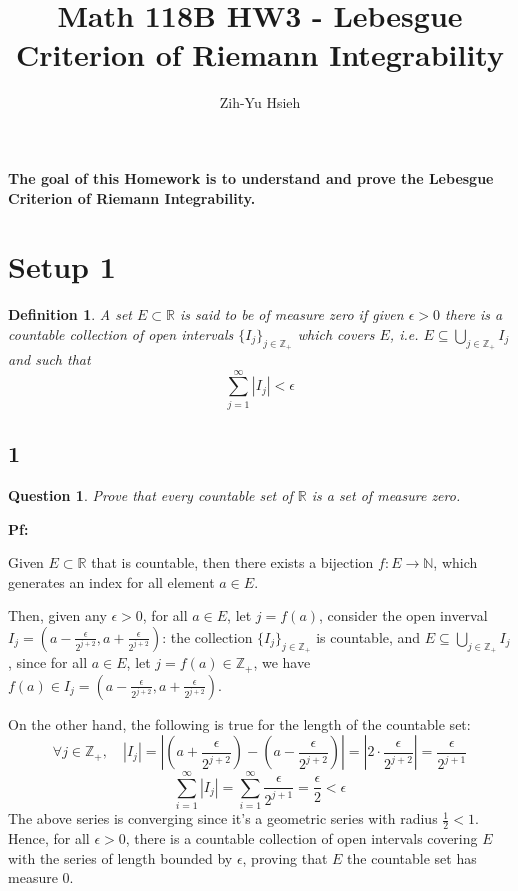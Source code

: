 \documentclass{article}
\title{Math 118B HW3 - Lebesgue Criterion of Riemann Integrability}
\author{Zih-Yu Hsieh}
\newtheorem{definition}{Definition}
\newtheorem{question}{Question}
\begin{document}
\maketitle

\textbf{The goal of this Homework is to understand and prove the Lebesgue Criterion of Riemann Integrability.}

\section*{Setup 1}
\begin{myBox}[]{}
    \begin{definition}
        A set $E\subset \mathbb{R}$ is said to be of measure zero if given $\epsilon>0$ there is a
        countable collection of open intervals $\{I_j\}_{j\in\mathbb{Z}_+}$ which covers $E$, i.e. 
        $E\subseteq \bigcup_{j\in\mathbb{Z}_+}I_j$ and such that
        $$\sum_{j=1}^{\infty}|I_j|<\epsilon$$
    \end{definition}
\end{myBox}

\subsection*{1}
\begin{myBox2}[]{}
    \begin{question}
        Prove that every countable set of $\mathbb{R}$ is a set of measure zero.
    \end{question}
\end{myBox2}

\textbf{Pf:}

Given $E\subset \mathbb{R}$ that is countable, then there exists a bijection $f:E\rightarrow \mathbb{N}$,
which generates an index for all element $a\in E$. 

Then, given any $\epsilon>0$, for all $a\in E$, let $j=f(a)$, consider the open inverval $I_j=(a-\frac{\epsilon}{2^{j+2}},a+\frac{\epsilon}{2^{j+2}})$: 
the collection $\{I_j\}_{j\in\mathbb{Z}_+}$ is countable, and $E\subseteq \bigcup_{j\in\mathbb{Z}_+}I_j$,
since for all $a\in E$, let $j=f(a)\in\mathbb{Z}_+$, we have $f(a)\in I_j=(a-\frac{\epsilon}{2^{j+2}},a+\frac{\epsilon}{2^{j+2}})$.

On the other hand, the following is true for the length of the countable set:
$$\forall j\in\mathbb{Z}_+,\quad |I_j| = \left|(a+\frac{\epsilon}{2^{j+2}})-(a-\frac{\epsilon}{2^{j+2}})\right|=\left|2\cdot \frac{\epsilon}{2^{j+2}}\right|=\frac{\epsilon}{2^{j+1}}$$
$$\sum_{i=1}^{\infty}|I_j|=\sum_{i=1}^{\infty}\frac{\epsilon}{2^{j+1}}=\frac{\epsilon}{2}<\epsilon$$
The above series is converging since it's a geometric series with radius $\frac{1}{2}<1$. Hence, for all $\epsilon>0$,
there is a countable collection of open intervals covering $E$ with the series of length bounded by $\epsilon$, proving that $E$ the countable set has measure $0$.
\end{document}
